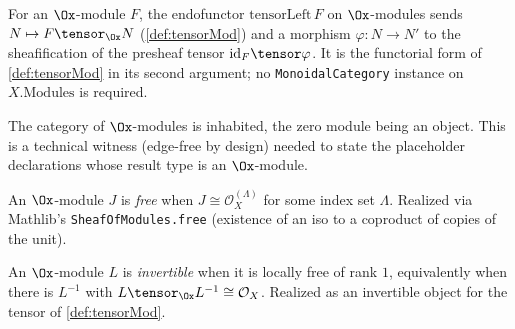 \begin{definition}
  \label{def:tensorLeft}
  For an $\Ox$-module $F$, the endofunctor $\mathrm{tensorLeft}\,F$ on
  $\Ox$-modules sends $N \mapsto F \tensor_{\Ox} N$ (\cref{def:tensorMod}) and a
  morphism $\varphi : N \to N'$ to the sheafification of the presheaf tensor
  $\mathrm{id}_F \tensor \varphi$. It is the functorial form of \cref{def:tensorMod}
  in its second argument; no \texttt{MonoidalCategory} instance on
  $X.\mathrm{Modules}$ is required.
\end{definition}

\begin{definition}
  \label{def:nonempty_modules}
  The category of $\Ox$-modules is inhabited, the zero module being an object.
  This is a technical witness (edge-free by design) needed to state the
  placeholder declarations whose result type is an $\Ox$-module.
\end{definition}

\begin{definition}

  \label{def:isFreeMod}
  An $\Ox$-module $J$ is \emph{free} when $J \cong \mathcal{O}_X^{(\Lambda)}$ for
  some index set $\Lambda$. Realized via Mathlib's \texttt{SheafOfModules.free}
  (existence of an iso to a coproduct of copies of the unit).
\end{definition}

\begin{definition}

  \label{def:isInvertibleMod}
  An $\Ox$-module $L$ is \emph{invertible} when it is locally free of rank $1$,
  equivalently when there is $L^{-1}$ with $L \tensor_{\Ox} L^{-1} \cong
  \mathcal{O}_X$. Realized as an invertible object for the tensor of
  \cref{def:tensorMod}.
\end{definition}


